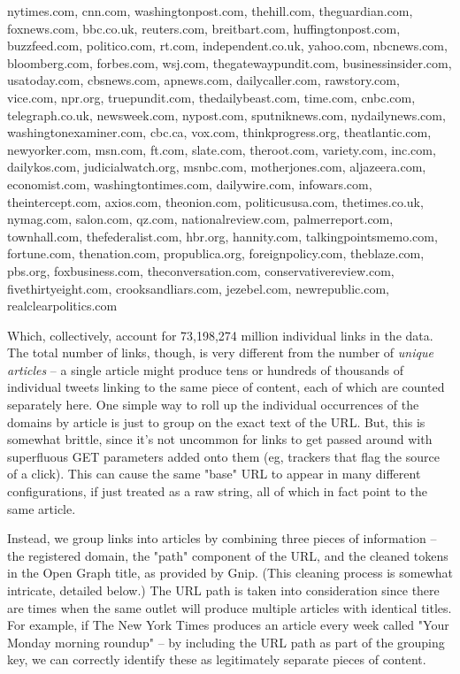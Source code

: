 \documentclass{scrartcl}
\begin{document}
\begin{displayquote}
\scriptsize \raggedright nytimes.com, cnn.com, washingtonpost.com, thehill.com, theguardian.com, foxnews.com, bbc.co.uk, reuters.com, breitbart.com, huffingtonpost.com, buzzfeed.com, politico.com, rt.com, independent.co.uk, yahoo.com, nbcnews.com, bloomberg.com, forbes.com, wsj.com, thegatewaypundit.com, businessinsider.com, usatoday.com, cbsnews.com, apnews.com, dailycaller.com, rawstory.com, vice.com, npr.org, truepundit.com, thedailybeast.com, time.com, cnbc.com, telegraph.co.uk, newsweek.com, nypost.com, sputniknews.com, nydailynews.com, washingtonexaminer.com, cbc.ca, vox.com, thinkprogress.org, theatlantic.com, newyorker.com, msn.com, ft.com, slate.com, theroot.com, variety.com, inc.com, dailykos.com, judicialwatch.org, msnbc.com, motherjones.com, aljazeera.com, economist.com, washingtontimes.com, dailywire.com, infowars.com, theintercept.com, axios.com, theonion.com, politicususa.com, thetimes.co.uk, nymag.com, salon.com, qz.com, nationalreview.com, palmerreport.com, townhall.com, thefederalist.com, hbr.org, hannity.com, talkingpointsmemo.com, fortune.com, thenation.com, propublica.org, foreignpolicy.com, theblaze.com, pbs.org, foxbusiness.com, theconversation.com, conservativereview.com, fivethirtyeight.com, crooksandliars.com, jezebel.com, newrepublic.com, realclearpolitics.com
\end{displayquote}


Which, collectively, account for 73,198,274 million individual links in the data. The total number of links, though, is very different from the number of \textit{unique articles} -- a single article might produce tens or hundreds of thousands of individual tweets linking to the same piece of content, each of which are counted separately here. One simple way to roll up the individual occurrences of the domains by article is just to group on the exact text of the URL. But, this is somewhat brittle, since it's not uncommon for links to get passed around with superfluous GET parameters added onto them (eg, trackers that flag the source of a click). This can cause the same "base" URL to appear in many different configurations, if just treated as a raw string, all of which in fact point to the same article.

Instead, we group links into articles by combining three pieces of information -- the registered domain, the "path" component of the URL, and the cleaned tokens in the Open Graph title, as provided by Gnip. (This cleaning process is somewhat intricate, detailed below.) The URL path is taken into consideration since there are times when the same outlet will produce multiple articles with identical titles. For example, if The New York Times produces an article every week called "Your Monday morning roundup" -- by including the URL path as part of the grouping key, we can correctly identify these as legitimately separate pieces of content.
\end{document}
